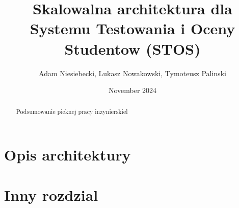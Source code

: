 \documentclass[a4paper]{report}
\begin{document}
\title{Skalowalna architektura dla Systemu Testowania i Oceny Studentow (STOS)}
\author{Adam Niesiebecki, Lukasz Nowakowski, Tymoteusz Palinski}
\date{November 2024}
\maketitle

\begin{abstract}
	Podsumowanie pieknej pracy inzynierskiel
\end{abstract}
\tableofcontents
\chapter{Opis architektury}

\chapter{Inny rozdzial}

\end{document}
